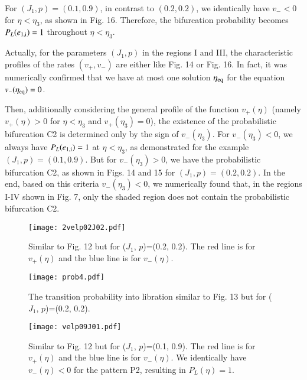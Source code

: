 \documentclass[useAMS,usenatbib,twocolumn]{mn2e}
\begin{document}
For $(J_1,p)=(0.1,0.9)$, in contrast to $(0.2,0.2)$, we identically have $v_-<0$ for $\eta<\eta_3$, as shown in Fig. 16. Therefore, the bifurcation probability becomes $P_L(e_{\rm 1,i})=1$ throughout  $\eta<\eta_3$. 


Actually, for the parameters $(J_1,p)$ in the regions I and III,  the characteristic profiles of the rates $(v_+,v_-)$ are either like Fig. 14 or Fig. 16.
In  fact,  it was numerically confirmed that we have at most one solution $\eta_{\rm eq}$ for the equation $v_-(\eta_{\rm eq})=0$.   


Then, additionally considering the general profile of the function $v_+(\eta)$ (namely $v_+(\eta)>0$ for $\eta<\eta_3$ and $v_+(\eta_3)=0$), the existence of the probabilistic bifurcation C2 is determined only by the sign of $v_-(\eta_3)$.  For $v_-(\eta_3)<0$, we always have $P_L(e_{\rm 1,i})=1$ at $\eta<\eta_3$, as demonstrated for the example $(J_1,p)=(0.1,0.9)$.  But for $v_-(\eta_3)>0$, we have the probabilistic bifurcation C2, as shown in Figs. 14 and 15 for  $(J_1,p)=(0.2,0.2)$. In the end, based on this criteria $v_-(\eta_3)<0$, we numerically found that, in the regions I-IV shown in  Fig. 7, only the shaded region does not contain the probabilistic bifurcation C2. 



\begin{figure}
\begin{center}
\texttt{[image: 2velp02J02.pdf]}
\caption{Similar to Fig. 12 but for ($J_1$,
$p$)=(0.2, 0.2). The red line is for $v_+(\eta)$  and the blue line is for  $v_-(\eta)$.}
\label{fig:vel2}
\end{center}
\end{figure}



\begin{figure}
\begin{center}
\texttt{[image: prob4.pdf]}
\caption{The transition probability into libration similar to Fig. 13 but for  ($J_1$, $p$)=(0.2, 0.2).}
\label{fig:prob2}
\end{center}
\end{figure}



\begin{figure}
\begin{center}
\texttt{[image: velp09J01.pdf]}
\caption{Similar to Fig. 12 but for  ($J_1$,
$p$)=(0.1, 0.9). The red line is for $v_+(\eta)$  and the blue line is for  $v_-(\eta)$. We identically have $v_{-}(\eta)<0$ for the pattern P2, resulting in $P_L(\eta)=1$.}
\label{fig:vel3}
\end{center}
\end{figure}
\end{document}

